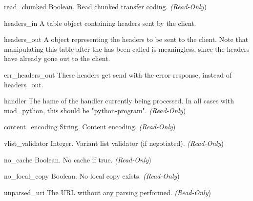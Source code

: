 \begin{memberdesc}[request]{read_chunked}
Boolean. Read chunked transfer coding.
\emph{(Read-Only})
\end{memberdesc}

\begin{memberdesc}[request]{headers_in}
A table object containing headers sent by the client.
\end{memberdesc}

\begin{memberdesc}[request]{headers_out}
A  object representing the headers to be sent to the
client. Note that manipulating this table after the
 has been called is meaningless, since the
headers have already gone out to the client.
\end{memberdesc}

\begin{memberdesc}[request]{err_headers_out}
These headers get send with the error response, instead of
headers_out.
\end{memberdesc}

\begin{memberdesc}[request]{handler}
The hame of the handler currently being processed. In all cases with
mod_python, this should be "python-program".
\emph{(Read-Only})
\end{memberdesc}

\begin{memberdesc}[request]{content_encoding}
String. Content encoding.
\emph{(Read-Only})
\end{memberdesc}

\begin{memberdesc}[request]{vlist_validator}
Integer. Variant list validator (if negotiated).
\emph{(Read-Only})
\end{memberdesc}

\begin{memberdesc}[request]{no_cache}
Boolean. No cache if true.
\emph{(Read-Only})
\end{memberdesc}

\begin{memberdesc}[request]{no_local_copy}
Boolean. No local copy exists.
\emph{(Read-Only})
\end{memberdesc}

\begin{memberdesc}[request]{unparsed_uri}
The URL without any parsing performed.
\emph{(Read-Only})
\end{memberdesc}

